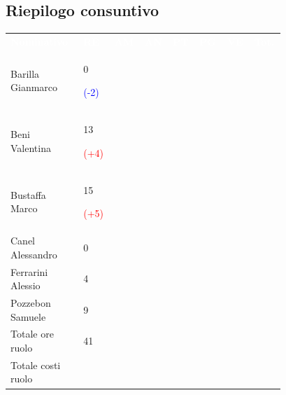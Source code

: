 \subsection{Riepilogo consuntivo}
{\renewcommand{\arraystretch}{2.0}
        \begin{tabular}{P{0.25\linewidth}P{0.07\linewidth}P{0.07\linewidth}P{0.07\linewidth}P{0.08\linewidth}P{0.08\linewidth}P{0.08\linewidth}P{0.08\linewidth}}
            \textcolor{white}{\textbf{Nominativo}} & \textcolor{white}{\textbf{RE}} &
            \textcolor{white}{\textbf{AM}} & \textcolor{white}{\textbf{AN}} &
            \textcolor{white}{\textbf{PT}} & \textcolor{white}{\textbf{PG}} &
            \textcolor{white}{\textbf{VE}} & \textcolor{white}{\textbf{Tot.}}\\
        
            Barilla Gianmarco & 0 \par \textcolor{blue}{(-2)} &  & & & & & \\
            
            Beni Valentina & 13 \par \textcolor{red}{(+4)} &  & & & & & \\

            Bustaffa Marco & 15 \par \textcolor{red}{(+5)}&  & & & & & \\

            Canel Alessandro & 0 &  & & & & & \\

            Ferrarini Alessio & 4 &  & & & & & \\

            Pozzebon Samuele & 9 &  & & & & & \\

            \hline\hline

            Totale ore ruolo & 41 &  & & & & & \\

            Totale costi ruolo &  &  & & & & & \\




        \end{tabular}
}






